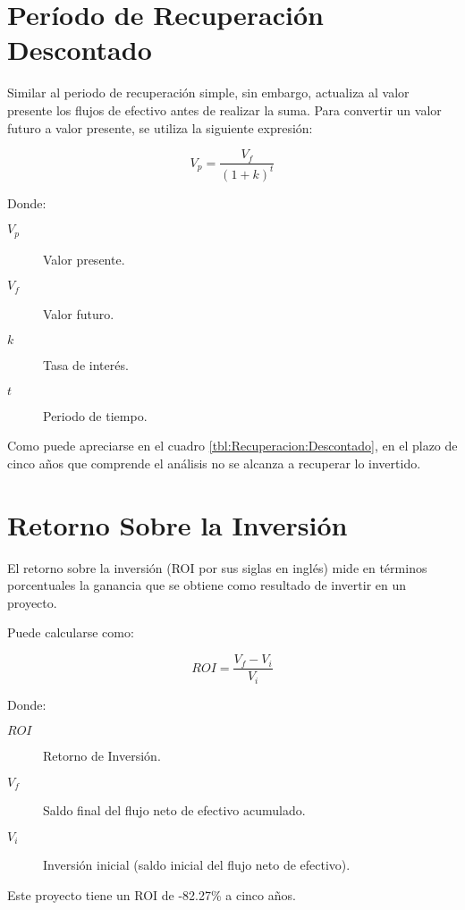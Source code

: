 

\section{Período de Recuperación Descontado}

Similar al periodo de recuperación simple, sin embargo, actualiza al valor presente los flujos de efectivo antes de realizar la suma. Para convertir un valor futuro a valor presente, se utiliza la siguiente expresión:

$$V_p = \frac{V_f}{\left(1+k\right)^t}$$

Donde:

\begin{description}
	\item[$V_p$] Valor presente.
	\item[$V_f$] Valor futuro.
	\item[$k$] Tasa de interés.
	\item[$t$] Periodo de tiempo.
\end{description}

Como puede apreciarse en el cuadro \ref{tbl:Recuperacion:Descontado}, en el plazo de cinco años que comprende el análisis no se alcanza a recuperar lo invertido.



\section{Retorno Sobre la Inversión}

El retorno sobre la inversión (ROI por sus siglas en inglés) mide en términos porcentuales la ganancia que se obtiene como resultado de invertir en un proyecto.

Puede calcularse como:

$$ROI = \frac{V_f - V_i}{V_i}$$

Donde:

\begin{description}
	\item[$ROI$] Retorno de Inversión.
	\item[$V_f$] Saldo final del flujo neto de efectivo acumulado.
	\item[$V_i$] Inversión inicial (saldo inicial del flujo neto de efectivo).
\end{description}

Este proyecto tiene un ROI de -82.27\% a cinco años.

